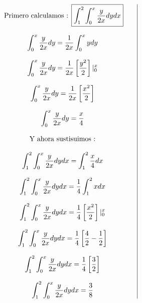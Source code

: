 \documentclass[12pt]{article}
\begin{document}
        
    \begin{center}
        \begin{equation*}
            \begin{array}{c|c}
                \begin{array}{rcl}
                    & \mbox{ Primero calculamos  :  \fbox{$\displaystyle\int_{1}^{2}\int_{0}^{x}\frac{y}{2x}dydx$}}&
                    \\
                    \\
                    & \displaystyle\int _{0}^{x}\frac{y}{2x}dy  = \displaystyle\frac{1}{2x}\int_{0}^{x}ydy &
                    \\
                    \\
                    & \displaystyle\int_{0}^{x}\frac{y}{2x}dy  =  \frac{1}{2x}\left[\frac{y^2}{2}\right]\vert_{0}^{x} &
                    \\
                    \\
                    &\displaystyle \int_{0}^{x}\frac{y}{2x}dy = \frac{1}{2x}\left[\frac{x^2}{2}\right] &
                    \\
                    \\
                    &\displaystyle\int_{0}^{x}\frac{y}{2x}dy  =  \frac{x}{4} &
                    \\
                    \\
                    &\displaystyle\mbox{Y ahora sustisuimos :} &
                    \\
                    \\
                    & \displaystyle \int_{1}^{2}\int_{0}^{x}\frac{y}{2x}dy dx  =  \int_{1}^{2} \frac{x}{4}dx &
                    \\
                    \\
                    &\displaystyle\int_{1}^{2}\int_{0}^{x}\frac{y}{2x}dy dx  =  \frac{1}{4}\int_{1}^{2}x dx  &
                    \\
                    \\
                    &\displaystyle\int_{1}^{2}\int_{0}^{x}\frac{y}{2x}dy dx  =  \frac{1}{4}\left[\frac{x^2}{2}\right]\vert_{0}^{x} &
                    \\
                    \\
                    & \displaystyle \int_{1}^{2}\int_{0}^{x}\frac{y}{2x}dy dx  =           \frac{1}{4}\left[\frac{4}{2}-\frac{1}{2}\right] &
                    \\
                    \\
                    &\displaystyle \int_{1}^{2}\int_{0}^{x}\frac{y}{2x}dy dx  =  \frac{1}{4}\left[\frac{3}{2}\right] &
                    \\
                    \\
                    & \displaystyle \int_{1}^{2}\int_{0}^{x}\frac{y}{2x}dy dx  =  \frac{3}{8}&
                    

\end{array}
\end{array}
\end{equation*}
\end{center}
\end{document}
